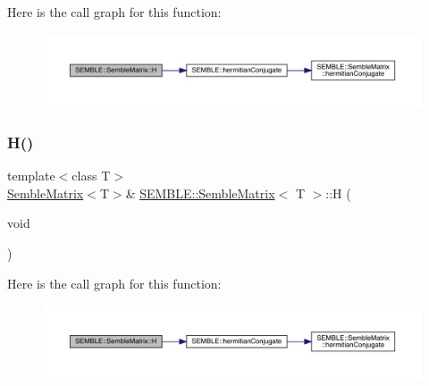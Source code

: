 Here is the call graph for this function\+:
\nopagebreak
\begin{figure}[H]
\begin{center}
\leavevmode
\includegraphics[width=350pt]{df/d87/structSEMBLE_1_1SembleMatrix_a560e987e3d3151b9d5c31b4bb919983a_cgraph}
\end{center}
\end{figure}
\mbox{\label{structSEMBLE_1_1SembleMatrix_a560e987e3d3151b9d5c31b4bb919983a}} 
\subsubsection{\texorpdfstring{H()}{H()}\hspace{0.1cm}{\footnotesize\ttfamily [2/2]}}
{\footnotesize\ttfamily template$<$class T$>$ \\
\mbox{\hyperlink{structSEMBLE_1_1SembleMatrix}{Semble\+Matrix}}$<$T$>$\& \mbox{\hyperlink{structSEMBLE_1_1SembleMatrix}{S\+E\+M\+B\+L\+E\+::\+Semble\+Matrix}}$<$ T $>$\+::H (\begin{DoxyParamCaption}\item[{void}]{ }\end{DoxyParamCaption})\hspace{0.3cm}{\ttfamily [inline]}}

Here is the call graph for this function\+:
\nopagebreak
\begin{figure}[H]
\begin{center}
\leavevmode
\includegraphics[width=350pt]{df/d87/structSEMBLE_1_1SembleMatrix_a560e987e3d3151b9d5c31b4bb919983a_cgraph}
\end{center}
\end{figure}
\mbox{\label{structSEMBLE_1_1SembleMatrix_a2d9ca142e670502eb4f05c559dc33f1d}} 
